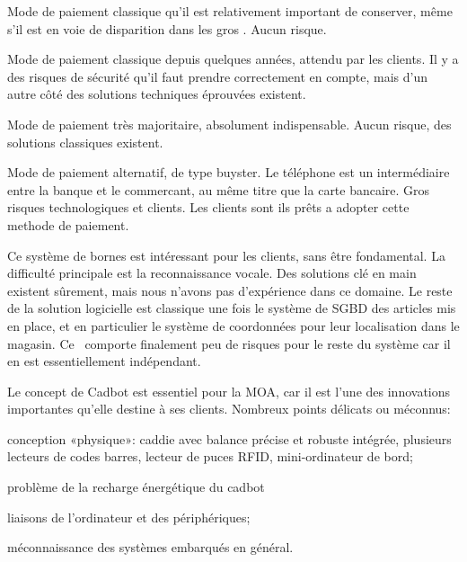 \startnote
{} Mode de paiement classique qu'il est relativement important de conserver, même s'il est en voie de disparition dans les gros \fm.
 Aucun risque.
\stopnote

\startnote
{} Mode de paiement classique depuis quelques années, attendu par les clients.
 Il y a des risques de sécurité qu'il faut prendre correctement en compte, mais d'un autre côté des solutions techniques éprouvées existent.
\stopnote

\startnote
{} Mode de paiement très majoritaire, absolument indispensable.
 Aucun risque, des solutions classiques existent.
\stopnote

\startnote
{} Mode de paiement alternatif, de type buyster. Le téléphone est un intermédiaire entre la banque et le commercant, au même titre que la carte bancaire. 
 Gros risques technologiques et clients. Les clients sont ils prêts a adopter cette methode de paiement.
\stopnote

\startnote
{} Ce système de bornes est intéressant pour les clients, sans être fondamental.
 La difficulté principale est la reconnaissance vocale. 
Des solutions clé en main existent sûrement, mais nous n'avons pas d'expérience dans ce domaine.
Le reste de la solution logicielle est classique une fois le système de SGBD des articles mis en place, et en particulier le système de coordonnées pour leur localisation dans le magasin.
Ce \cu\ comporte finalement peu de risques pour le reste du système car il en est essentiellement indépendant.
\stopnote

\startnote
{} Le concept de Cadbot est essentiel pour la MOA, car il est l'une des innovations importantes qu'elle destine à ses clients.
 Nombreux points délicats ou méconnus:
\startitemize
\item conception «physique»: caddie avec balance précise et robuste intégrée, plusieurs lecteurs de codes barres, lecteur de puces RFID, mini-ordinateur de bord;
\item problème de la recharge énergétique du cadbot
\item liaisons de l'ordinateur et des périphériques;
\item méconnaissance des systèmes embarqués en général.
\stopitemize
\stopnote

